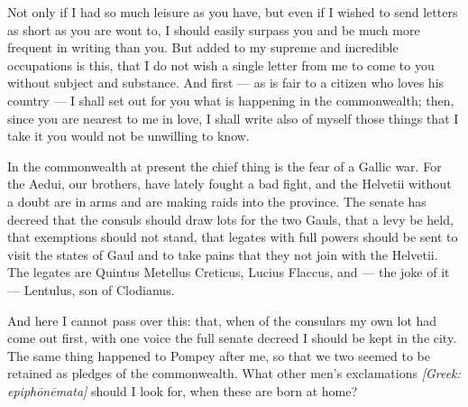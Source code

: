 

 Not only if I had so much leisure as you have, but even if I wished to send letters as short as you are wont to, I should easily surpass you and be much more frequent in writing than you. But added to my supreme and incredible occupations is this, that I do not wish a single letter from me to come to you without subject and substance. And first --- as is fair to a citizen who loves his country --- I shall set out for you what is happening in the commonwealth; then, since you are nearest to me in love, I shall write also of myself those things that I take it you would not be unwilling to know.

 In the commonwealth at present the chief thing is the fear of a Gallic war. For the Aedui, our brothers, have lately fought a bad fight, and the Helvetii without a doubt are in arms and are making raids into the province. The senate has decreed that the consuls should draw lots for the two Gauls, that a levy be held, that exemptions should not stand, that legates with full powers should be sent to visit the states of Gaul and to take pains that they not join with the Helvetii. The legates are Quintus Metellus Creticus, Lucius Flaccus, and --- the joke of it --- Lentulus, son of Clodianus.

 And here I cannot pass over this: that, when of the consulars my own lot had come out first, with one voice the full senate decreed I should be kept in the city. The same thing happened to Pompey after me, so that we two seemed to be retained as pledges of the commonwealth. What other men's exclamations \textit{[Greek: epiph\=on\=emata]} should I look for, when these are born at home?


